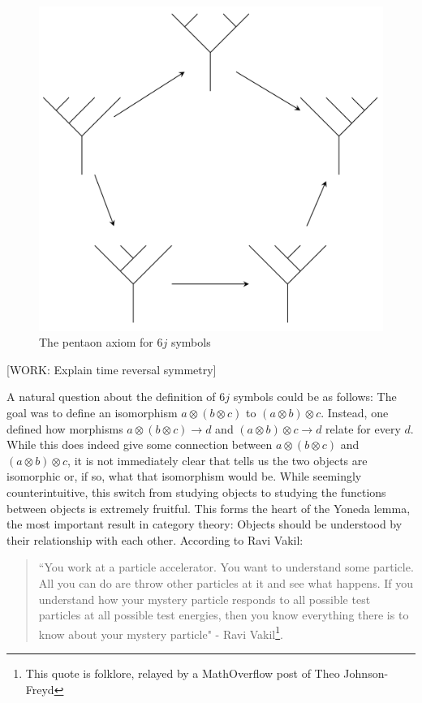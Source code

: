 \documentclass{article}
\theoremstyle{definition}
\numberwithin{figure}{section}
\begin{document}
\begin{figure}
\begin{center}
\includegraphics[scale=0.28]{pentagon}
\caption{The pentaon axiom for $6j$ symbols}
\label{fig:pentagon}
\end{center}
\end{figure}


[WORK: Explain time reversal symmetry]

A natural question about the definition of $6j$ symbols could be as follows: The goal was to define an isomorphism $a\otimes (b\otimes c)$ to $(a\otimes b)\otimes c$. Instead, one defined how morphisms $a\otimes (b\otimes c)\to d$
 and $(a\otimes b)\otimes c\to d$ relate for every $d$. While this does indeed give some connection between $a\otimes (b\otimes c)$ and $(a\otimes b)\otimes c$, it is not immediately clear that tells us the two objects are isomorphic or, if so, what that isomorphism would be. While seemingly counterintuitive, this switch from studying objects to studying the functions between objects is extremely fruitful. This forms the heart of the Yoneda lemma, the most important result in category theory: Objects should be understood by their relationship with each other. According to Ravi Vakil:

\begin{quote}
``You work at a particle accelerator. You want to understand some particle. All you can do are throw other particles at it and see what happens. If you understand how your mystery particle responds to all possible test particles at all possible test energies, then you know everything there is to know about your mystery particle" - Ravi Vakil\footnote{This quote is folklore, relayed by a MathOverflow post of Theo Johnson-Freyd}.
\end{quote}
\end{document}
